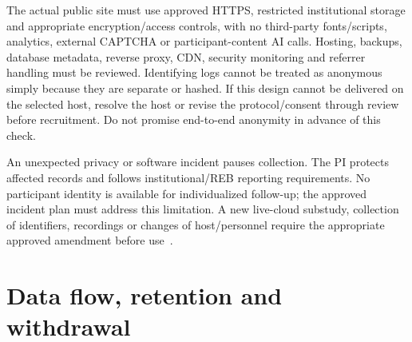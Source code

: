 \documentclass[11pt,letterpaper]{article}
\begin{document}
The actual public site must use approved HTTPS, restricted institutional storage and appropriate encryption/access controls, with no third-party fonts/scripts, analytics, external CAPTCHA or participant-content AI calls. Hosting, backups, database metadata, reverse proxy, CDN, security monitoring and referrer handling must be reviewed. Identifying logs cannot be treated as anonymous simply because they are separate or hashed. If this design cannot be delivered on the selected host, resolve the host or revise the protocol/consent through review before recruitment. Do not promise end-to-end anonymity in advance of this check.

An unexpected privacy or software incident pauses collection. The PI protects affected records and follows institutional/REB reporting requirements. No participant identity is available for individualized follow-up; the approved incident plan must address this limitation. A new live-cloud substudy, collection of identifiers, recordings or changes of host/personnel require the appropriate approved amendment before use~\cite{sfu-review}.

\section{Data flow, retention and withdrawal}
\end{document}
